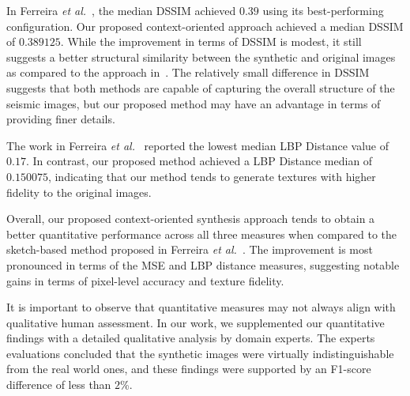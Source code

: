 \documentclass{ieeeaccess}
\begin{document}
In Ferreira \emph{et al.}~\cite{Ferreira2020}, the median DSSIM achieved $0.39$ using its best-performing configuration. Our proposed context-oriented approach achieved a median DSSIM of $0.389125$. While the improvement in terms of DSSIM is modest, it still suggests a better structural similarity between the synthetic and original images as compared to the approach in~\cite{Ferreira2020}. The relatively small difference in DSSIM suggests that both methods are capable of capturing the overall structure of the seismic images, but our proposed method may have an advantage in terms of providing finer details.

The work in Ferreira \emph{et al.}~\cite{Ferreira2020} reported the lowest median LBP Distance value of $0.17$. In contrast, our proposed method achieved a LBP Distance median of $0.150075$, indicating that our method tends to generate textures with higher fidelity to the original images.

Overall, our proposed context-oriented synthesis approach tends to obtain a better quantitative performance across all three measures when compared to the sketch-based method proposed in Ferreira \emph{et al.}~\cite{Ferreira2020}. The improvement is most pronounced in terms of the MSE and LBP distance measures, suggesting notable gains in terms of pixel-level accuracy and texture fidelity.

It is important to observe that quantitative measures may not always align with qualitative human assessment. In our work, we supplemented our quantitative findings with a detailed qualitative analysis by domain experts. The experts evaluations concluded that the synthetic images were virtually indistinguishable from the real world ones, and these findings were supported by an F1-score difference of less than $2$\%.
\end{document}
